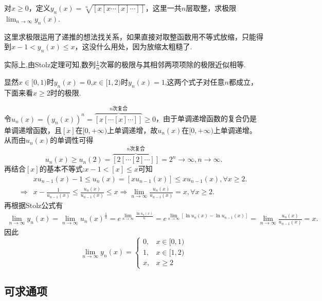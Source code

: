 \documentclass[../../main.tex]{subfiles}%
\begin{document}
\begin{example}
对\(x\geqslant 0\)，定义\(y_n(x)=\sqrt[n]{[x[x\cdots[x]\cdots]]}\)，这里一共\(n\)层取整，求极限\(\lim_{n\rightarrow\infty}y_n(x)\).
\end{example}
\begin{note}
这里求极限运用了递推的想法找关系，如果直接对取整函数用不等式放缩，只能得到\(x - 1<y_n(x)\leqslant  x\)，这没什么用处，因为放缩太粗糙了.

实际上,由Stolz定理可知,数列$\frac{1}{n}$次幂的极限与其相邻两项项除的极限近似相等.
\end{note}
\begin{solution}
显然\(x\in[0,1)\)时\(y_n(x)=0\),\(x\in[1,2)\)时\(y_n(x)=1\),这两个式子对任意\(n\)都成立，下面来看\(x\geqslant 2\)时的极限.

令\(u_n(x) = (y_n(x))^n=\overbrace{[x[\cdots [x]\cdots ]]}^{n\text{次复合}}\geqslant 0\)，由于单调递增函数的复合仍是单调递增函数，且\([x]\)在\([0, +\infty)\)上单调递增，故\(u_n(x)\)在\([0, +\infty)\)上单调递增。
从而由\(u_n(x)\)的单调性可得
\[
u_n(x) \geqslant u_n(2)=\overbrace{[2[\cdots [2]\cdots ]]}^{n\text{次复合}} = 2^n\rightarrow \infty, n\rightarrow \infty.
\]
再结合\([x]\)的基本不等式:$x-1<\left[ x \right] \leqslant x$可知
\begin{align*}
&xu_{n-1}(x)-1\leqslant u_n(x)=[xu_{n-1}(x)]\leqslant xu_{n-1}(x),\forall x\geqslant 2.
\\
\Rightarrow &x-\frac{1}{u_{n-1}(x)}\leqslant \frac{u_n(x)}{u_{n-1}(x)}\leqslant x\Rightarrow \lim_{n\rightarrow \infty} \frac{u_n(x)}{u_{n-1}(x)}=x,\forall x\geqslant 2.
\end{align*}
再根据Stolz公式有
\begin{align*}
\lim_{n\rightarrow \infty} y_n(x)=\lim_{n\rightarrow \infty} u_n(x)^{\frac{1}{n}}=e^{\lim\limits_{n\rightarrow \infty} \frac{\ln u_n(x)}{n}}=e^{\lim\limits_{n\rightarrow \infty} [\ln u_n(x)-\ln u_{n-1}(x)]}=\lim_{n\rightarrow \infty} \frac{u_n(x)}{u_{n-1}(x)}=x.
\end{align*}
因此
\[ 
\lim_{n\rightarrow\infty}y_n(x)=
\begin{cases}
0, & x\in[0,1)\\
1, & x\in[1,2)\\
x, & x\geqslant 2
\end{cases}
\]

\end{solution}


\subsection{可求通项}
\end{document}
